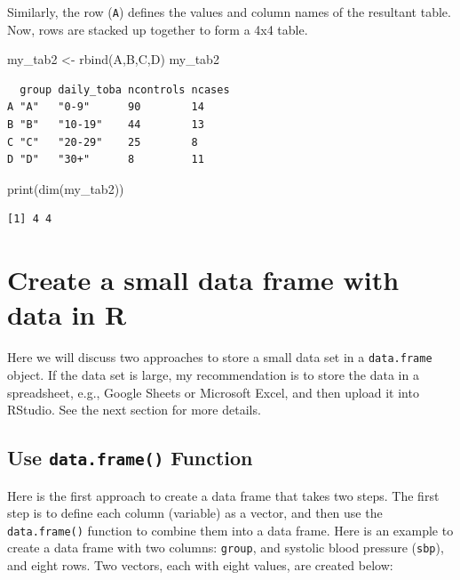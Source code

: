 \documentclass[
  letterpaper,
  DIV=11,
  numbers=noendperiod]{scrreprt}
\newenvironment{Shaded}{\begin{snugshade}}{\end{snugshade}}
\newcommand{\FunctionTok}[1]{\textcolor[rgb]{0.28,0.35,0.67}{#1}}
\newcommand{\NormalTok}[1]{\textcolor[rgb]{0.00,0.23,0.31}{#1}}
\newcommand{\OtherTok}[1]{\textcolor[rgb]{0.00,0.23,0.31}{#1}}
\begin{document}
Similarly, the row (\texttt{A}) defines the values and column names of
the resultant table. Now, rows are stacked up together to form a 4x4
table.

\begin{Shaded}
\begin{Highlighting}[]
\NormalTok{my\_tab2 }\OtherTok{\textless{}{-}} \FunctionTok{rbind}\NormalTok{(A,B,C,D)}
\NormalTok{my\_tab2}
\end{Highlighting}
\end{Shaded}

\begin{verbatim}
  group daily_toba ncontrols ncases
A "A"   "0-9"      90        14    
B "B"   "10-19"    44        13    
C "C"   "20-29"    25        8     
D "D"   "30+"      8         11    
\end{verbatim}

\begin{Shaded}
\begin{Highlighting}[]
\FunctionTok{print}\NormalTok{(}\FunctionTok{dim}\NormalTok{(my\_tab2))}
\end{Highlighting}
\end{Shaded}

\begin{verbatim}
[1] 4 4
\end{verbatim}

\section{Create a small data frame with data in
R}\label{create-a-small-data-frame-with-data-in-r}

Here we will discuss two approaches to store a small data set in a
\texttt{data.frame} object. If the data set is large, my recommendation
is to store the data in a spreadsheet, e.g., Google Sheets or Microsoft
Excel, and then upload it into RStudio. See the next section for more
details.

\subsection{\texorpdfstring{Use \texttt{data.frame()}
Function}{Use data.frame() Function}}\label{use-data.frame-function}

Here is the first approach to create a data frame that takes two steps.
The first step is to define each column (variable) as a vector, and then
use the \texttt{data.frame()} function to combine them into a data
frame. Here is an example to create a data frame with two columns:
\texttt{group}, and systolic blood pressure (\texttt{sbp}), and eight
rows. Two vectors, each with eight values, are created below:
\end{document}
